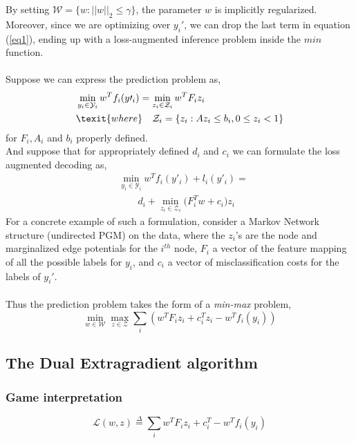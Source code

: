 \documentclass{article}
\begin{document}
By setting $\mathcal{W}=\{ w: || w||_{2}\leq \gamma\}$, the parameter $ w$ is implicitly regularized. Moreover, since we are
optimizing over $ y_i'$, we can drop the last term in equation (\ref{eq1}), ending
up with a loss-augmented inference problem inside the $min$ function.\\
\\
Suppose we can express the prediction problem as,
\begin{equation*}
\begin{aligned}
    &\min_{ y_{i} \in \mathcal{Y}_{i}} w^{T}f_{i}(y\prime_{i})= \min_{ z_{i} \in \mathcal{Z}_{i}} w^{T}F_{i}z_{i}\\
    &\texit{where}\quad \mathcal{Z}_{i}=\{z_{i}: Az_{i}\leq b_{i}, 0\leq z_{i} < 1\}
\end{aligned}
\end{equation*}
for $F_{i}, A_{i}$ and $b_{i}$ properly defined.\\ And suppose that for appropriately defined $d_{i}$ and $c_{i}$ we can formulate the loss augmented decoding as,
\begin{equation*}
\begin{aligned}
    &\min_{ y_{i} \in \mathcal{Y}_{i}} w^{T}f_{i}(y\prime_{i})+ l_{i}(y\prime_{i})=\\
    &\quad\quad d_{i}+ \min_{ z_{i} \in \mathcal{Z}_{i}}\Big(F^{T}_{i}w+ c_{i}\Big)z_{i}
\end{aligned}
\end{equation*}
For a concrete example of such a formulation, consider a Markov Network structure (undirected PGM) on the data, where the $ z_i$'s are the node and marginalized edge potentials for the $i^{th}$ node, $ F_i$ a vector of the feature mapping of all the possible labels for $ y_i$, and $ c_i$ a vector of misclassification costs for the labels of $ y_i'$.\\
\\
Thus the prediction problem takes the form of a \textit{min-max} problem,
\begin{equation}
  \min_{ w \in \mathcal{W}} \max_{ z \in \mathcal{Z}} \sum_i \left( 
w^T  F_i  z_i +  c_i^T  z_i -  w^T  f_i( y_i)
\right)
  \label{saddle_point}
\end{equation}
\subsection{The Dual Extragradient algorithm}
\subsubsection{Game interpretation}
\begin{equation}
  \mathcal{L}( w, z) \overset{\Delta}{=} \sum_i  w^T  F_i  z_i + 
c_i^T -  w^T  f_i( y_i)
  \label{saddle_obj}
\end{equation}
\end{document}
